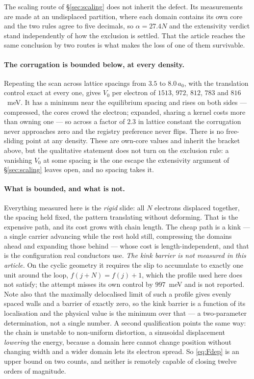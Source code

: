 \documentclass[11pt]{article}
\begin{document}
The scaling route of \S\ref{sec:scaling} does not inherit the defect. Its measurements are made at
an undisplaced partition, where each domain contains its own core and the two rules agree to five
decimals, so $\alpha=27.4N$ and the extensivity verdict stand independently of how the exclusion is
settled. That the article reaches the same conclusion by two routes is what makes the loss of one of
them survivable.

\paragraph{The corrugation is bounded below, at every density.} Repeating the scan across lattice
spacings from $3.5$ to $8.0\,a_0$, with the translation control exact at every one, gives $V_0$ per
electron of $1513$, $972$, $812$, $783$ and $816$~meV. It has a minimum near the equilibrium spacing
and rises on both sides --- compressed, the cores crowd the electron; expanded, sharing a kernel
costs more than owning one --- so across a factor of $2.3$ in lattice constant the corrugation never
approaches zero and the registry preference never flips. There is no free-sliding point at any
density. These are own-core values and inherit the bracket above, but the qualitative statement does
not turn on the exclusion rule: a vanishing $V_0$ at some spacing is the one escape the extensivity
argument of \S\ref{sec:scaling} leaves open, and no spacing takes it.

\paragraph{What is bounded, and what is not.} Everything measured here is the \emph{rigid} slide:
all $N$ electrons displaced together, the spacing held fixed, the pattern translating without
deforming. That is the expensive path, and its cost grows with chain length. The cheap path is a
kink --- a single carrier advancing while the rest hold still, compressing the domains ahead and
expanding those behind --- whose cost is length-independent, and that is the configuration real
conductors use. \emph{The kink barrier is not measured in this article.} On the cyclic geometry it
requires the slip to accumulate to exactly one unit around the loop, $f(j+N)=f(j)+1$, which the
profile used here does not satisfy; the attempt misses its own control by $997$~meV and is not
reported. Note also that the maximally delocalised limit of such a profile gives evenly spaced walls
and a barrier of exactly zero, so the kink barrier is a function of its localisation and the physical
value is the minimum over that --- a two-parameter determination, not a single number. A second
qualification points the same way: the chain is unstable to non-uniform distortion, a sinusoidal
displacement \emph{lowering} the energy, because a domain here cannot change position without
changing width and a wider domain lets its electron spread. So \eqref{eq:Fdep} is an upper bound on
two counts, and neither is remotely capable of closing twelve orders of magnitude.
\end{document}
